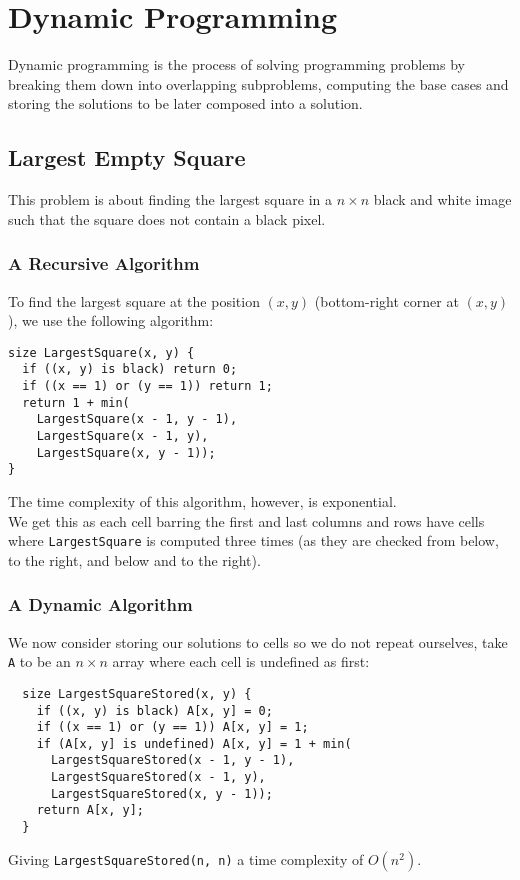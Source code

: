 \section{Dynamic Programming}

Dynamic programming is the process of solving programming problems
by breaking them down into overlapping subproblems,
computing the base cases and storing the solutions to be later
composed into a solution.

\subsection{Largest Empty Square}

This problem is about finding the largest square in a $n \times n$
black and white image such that the square does not contain a black
pixel.

\subsubsection{A Recursive Algorithm}

To find the largest square at the position $(x, y)$ 
(bottom-right corner at $(x, y)$), we use the
following algorithm: \begin{lstlisting}
size LargestSquare(x, y) {
  if ((x, y) is black) return 0;
  if ((x == 1) or (y == 1)) return 1;
  return 1 + min(
    LargestSquare(x - 1, y - 1),
    LargestSquare(x - 1, y),
    LargestSquare(x, y - 1));
}
\end{lstlisting} The time complexity of this algorithm, however,
is exponential.
\\[\baselineskip]
We get this as each cell barring the first and last columns and rows 
have cells where \texttt{LargestSquare} is computed three times 
(as they  are checked from below, to the right, and below and to 
the right).

\newpage

\subsubsection{A Dynamic Algorithm}

We now consider storing our solutions to cells so we do not repeat
ourselves, take \texttt{A} to be an $n \times n$ array
where each cell is undefined as first: \begin{lstlisting}
  size LargestSquareStored(x, y) {
    if ((x, y) is black) A[x, y] = 0;
    if ((x == 1) or (y == 1)) A[x, y] = 1;
    if (A[x, y] is undefined) A[x, y] = 1 + min(
      LargestSquareStored(x - 1, y - 1),
      LargestSquareStored(x - 1, y),
      LargestSquareStored(x, y - 1));
    return A[x, y];
  }
\end{lstlisting} Giving \texttt{LargestSquareStored(n, n)} a time 
complexity of $O(n^2)$.

